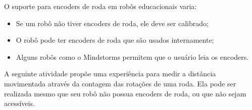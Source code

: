 
O suporte para encoders de roda em robôs educacionais varia:
\begin{itemize}
\item Se um robô não tiver encoders de roda, ele deve ser calibrado;
\item O robô pode ter encoders de roda que são usados internamente;
\item Alguns robôs como o \lego Mindstorms permitem que o usuário leia os encoders.
\end{itemize}
A seguinte atividade propõe uma experiência para medir a distância movimentada através da contagem das rotações de uma roda. Ela pode ser realizada mesmo que seu robô não possua encoders de roda, ou que não sejam acessíveis.

